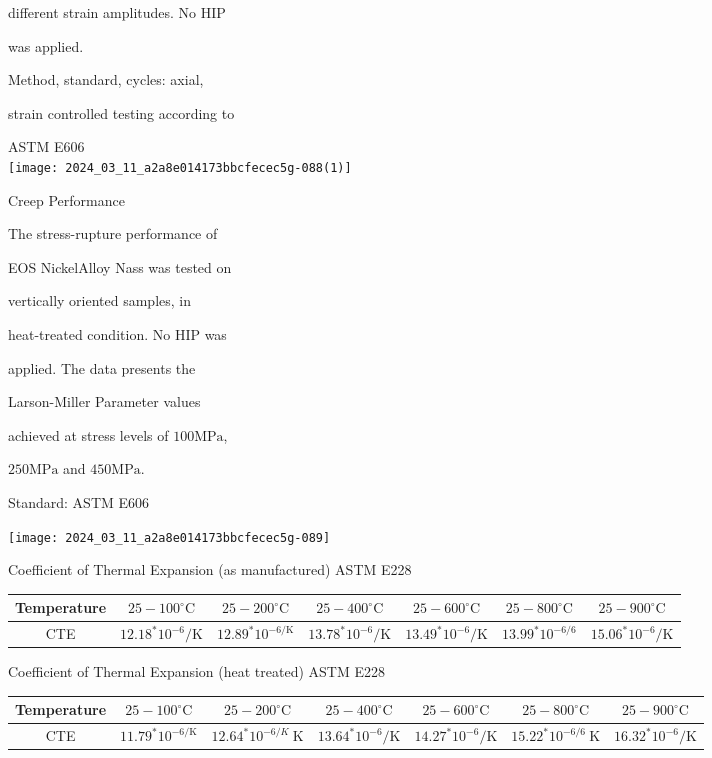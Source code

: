 \documentclass[10pt]{article}
\begin{document}
different strain amplitudes. No HIP

was applied.

Method, standard, cycles: axial,

strain controlled testing according to

ASTM E606\\
\texttt{[image: 2024\_03\_11\_a2a8e014173bbcfecec5g-088(1)]}

Creep Performance

The stress-rupture performance of

EOS NickelAlloy Nass was tested on

vertically oriented samples, in

heat-treated condition. No HIP was

applied. The data presents the

Larson-Miller Parameter values

achieved at stress levels of $100 \mathrm{MPa}$,

$250 \mathrm{MPa}$ and $450 \mathrm{MPa}$.

Standard: ASTM E606

\begin{center}
\texttt{[image: 2024\_03\_11\_a2a8e014173bbcfecec5g-089]}
\end{center}

Coefficient of Thermal Expansion (as manufactured) ASTM E228

\begin{center}
\begin{tabular}{|c|c|c|c|c|c|c|}
\hline
Temperature & $25-100^{\circ} \mathrm{C}$ & $25-200^{\circ} \mathrm{C}$ & $25-400^{\circ} \mathrm{C}$ & $25-600^{\circ} \mathrm{C}$ & $25-800^{\circ} \mathrm{C}$ & $25-900^{\circ} \mathrm{C}$ \\
\hline
CTE & $12.18^{*} 10^{-6} / \mathrm{K}$ & $12.89^{*} 10^{-6 / \mathrm{K}}$ & $13.78^{*} 10^{-6} / \mathrm{K}$ & $13.49^{*} 10^{-6} / \mathrm{K}$ & $13.99^{*} 10^{-6 / 6}$ & $15.06^{*} 10^{-6} / \mathrm{K}$ \\
\hline
\end{tabular}
\end{center}

Coefficient of Thermal Expansion (heat treated) ASTM E228

\begin{center}
\begin{tabular}{|c|c|c|c|c|c|c|}
\hline
Temperature & $25-100^{\circ} \mathrm{C}$ & $25-200^{\circ} \mathrm{C}$ & $25-400^{\circ} \mathrm{C}$ & $25-600^{\circ} \mathrm{C}$ & $25-800^{\circ} \mathrm{C}$ & $25-900^{\circ} \mathrm{C}$ \\
\hline
CTE & $11.79^{*} 10^{-6 / \mathrm{K}}$ & $12.64^{*} 10^{-6 / K} \mathrm{~K}$ & $13.64^{*} 10^{-6} / \mathrm{K}$ & $14.27^{*} 10^{-6} / \mathrm{K}$ & $15.22^{*} 10^{-6 / 6} \mathrm{~K}$ & $16.32^{*} 10^{-6} / \mathrm{K}$ \\
\hline
\end{tabular}
\end{center}
\end{document}
